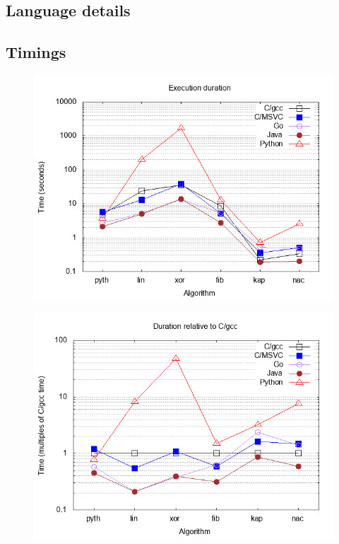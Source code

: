 \documentclass[a4paper,11pt]{article}
\begin{document}


\subsection{Language details}



\subsection{Timings}

\begin{figure}[h]
\centering
\includegraphics[scale=0.75]{"v1/times.png"}
\end{figure}

\begin{figure}[h]
\centering
\includegraphics[scale=0.75]{"v1/normalised.png"}
\end{figure}
\end{document}
